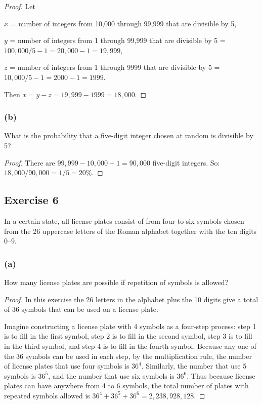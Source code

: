 \documentclass[14pt]{extarticle}
\newcommand{\cy}{\color{cyan}}
\begin{document}
\begin{proof}
     Let

     $x$ = number of integers from 10,000 through 99,999 that are divisible by 5,

     $y$ = number of integers from 1 through 99,999 that are divisible by 5 = \(100,000 / 5 - 1 = 20,000 - 1 = 19,999\),

     $z$ = number of integers from 1 through 9999 that are divisible by 5 = \(10,000 / 5 - 1 = 2000 - 1 = 1999\).

     Then \(x = y - z = 19,999 - 1999 = 18,000\).
\end{proof}

\subsubsection{(b)}
What is the probability that a five-digit integer chosen at random is divisible by 5?

\begin{proof}
     There are \(99,999 - 10,000 + 1 = 90,000\) five-digit integers. So: \(18,000 / 90,000 = 1/5 = 20\%\).
\end{proof}

\subsection{Exercise 6}
In a certain state, all license plates consist of from four to six symbols chosen from the 26 uppercase letters of the
Roman alphabet together with the ten digits 0–9.

\subsubsection{(a)}
How many license plates are possible if repetition of symbols is allowed?

\begin{proof}
     In this exercise the 26 letters in the alphabet plus the 10 digits give a total of 36 symbols that can be used on a
     license plate.

     Imagine constructing a license plate with 4 symbols as a four-step process: {\cy step 1} is to fill in the first symbol, {\cy step 2} is to fill in the second symbol, {\cy step 3} is to fill in the third symbol, and {\cy step 4} is to fill in the fourth symbol. Because any one of the 36 symbols can be used in each step, by the multiplication rule, the number of license plates that use four symbols is \(36^4\). Similarly, the number that use 5 symbols is \(36^5\), and the number that use six symbols is \(36^6\). Thus because license plates can have anywhere from 4 to 6 symbols, the total number of plates with repeated symbols allowed is \(36^4 + 36^5 + 36^6 = 2,238,928,128\).
\end{proof}
\end{document}
